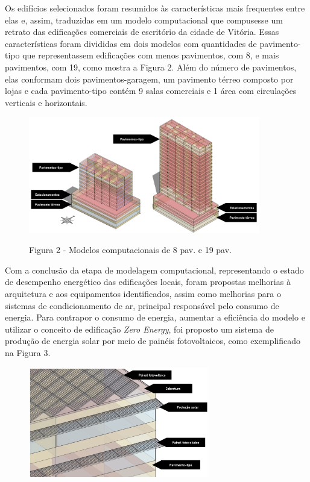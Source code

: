 \begin{onehalfspace}
    \noindent Os edifícios selecionados foram resumidos às características mais frequentes entre elas e, assim, traduzidas em um modelo computacional que compusesse um retrato das edificações comerciais de escritório da cidade de Vitória. Essas características foram divididas em dois modelos com quantidades de pavimento-tipo que representassem edificações com menos pavimentos, com 8, e mais pavimentos, com 19, como mostra a Figura 2. Além do número de pavimentos, elas conformam dois pavimentos-garagem, um pavimento térreo composto por lojas e cada pavimento-tipo contém 9 salas comerciais e 1 área com circulações verticais e horizontais.%
    \begin{figure}[H]
        \centering
        \includegraphics[width=0.9\textwidth]{figures/fig11_8-19-2pav.png}
        \begin{center}
            \scriptsize Figura 2 - Modelos computacionais de 8 pav. e 19 pav.
        \end{center}
    \end{figure}\vspace*{-0.3cm}
    \noindent Com a conclusão da etapa de modelagem computacional, representando o estado de desempenho energético das edificações locais, foram propostas melhorias à arquitetura e aos equipamentos identificados, assim como melhorias para o sistemas de condicionamento de ar, principal responsável pelo consumo de energia. Para contrapor o consumo de energia, aumentar a eficiência do modelo e utilizar o conceito de edificação \textit{Zero Energy}, foi proposto um sistema de produção de energia solar por meio de painéis fotovoltaicos, como exemplificado na Figura 3.
    \begin{figure}[H]
        \centering
        \includegraphics[width=0.7\textwidth]{figures/paineis pv2.png}

\end{figure}
\end{onehalfspace}
